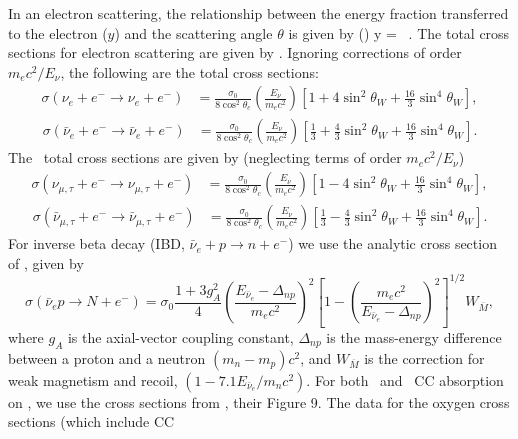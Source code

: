In an electron scattering, the relationship between the energy fraction transferred to the
electron ($y$) and the scattering angle
$\theta$ is given by (\citealt{tomasetal2003})
%
\beq
 y = 
 ~. 
\eeq
%
The total cross sections for electron scattering are given by
\cite{marcianoparsa2003}.
 Ignoring corrections of order $m_ec^2/E_\nu$,  the following are the 
  total cross sections:
\begin{align}
\sigma (\nu_e + e^- \rightarrow \nu_e + e^-) &= \frac{\sigma_0}{8\cos^2{\theta_c}}\left(\frac{E_\nu}{m_ec^2}\right) [1+4\sin^2\theta_W + \frac{16}{3} \sin^4\theta_W],
\end{align}
\begin{align}
\sigma (\bar\nu_e + e^- \rightarrow \bar\nu_e + e^-)  &= \frac{\sigma_0}{8\cos^2{\theta_c}}\left(\frac{E_\nu}{m_ec^2}\right)[\frac13+\frac43\sin^2\theta_W + \frac{16}{3} \sin^4\theta_W].
\end{align}
The \nux\ total cross sections are given by (neglecting terms of
 order $m_ec^2/E_\nu$)
\begin{align}
\sigma (\nu_{\mu,\tau} + e^- \rightarrow \nu_{\mu,\tau} + e^-)  &= \frac{\sigma_0}{8\cos^2{\theta_c}}\left(\frac{E_\nu}{m_ec^2}\right) [1-4\sin^2\theta_W + \frac{16}{3} \sin^4\theta_W],
\end{align}
\begin{align}
\sigma (\bar\nu_{\mu,\tau} + e^- \rightarrow \bar\nu_{\mu,\tau} + e^-) &= \frac{\sigma_0}{8\cos^2{\theta_c}}\left(\frac{E_\nu}{m_ec^2}\right)[\frac13-\frac43\sin^2\theta_W + \frac{16}{3} \sin^4\theta_W].
\end{align}
For inverse beta decay (IBD, $\bar\nu_e + p \rightarrow n + e^-$)
we use the analytic cross section of \cite{burrowsetal2006}, given by
\begin{equation}
\label{eq:anuep}
\sigma({\bar\nu_e p \rightarrow N + e^-}) =
\sigma_0\frac{1+3g_A^2}{4}\left(\frac{E_{\bar\nu_e}-\Delta_{np}}{m_ec^2}\right)^2
\left[1-\left(\frac{m_ec^2}{E_{\bar\nu_e} - \Delta_{np}}\right)^2\right]^{1/2} W_{\overline{M}},
\end{equation}
where $g_A$ is the axial-vector coupling constant, $\Delta_{np}$ is the mass-energy difference between a
proton and a neutron $(m_n - m_p)c^2$, and
$W_{\overline{M}}$ 
is the correction for weak magnetism and
recoil, $(1-7.1 E_{\bar\nu_e}/m_nc^2)$.
For both \nue\ and \anue\ CC absorption on , 
we use the cross sections from \cite{kolbeetal2003}, their Figure 9.
The data for the oxygen cross sections (which include CC

